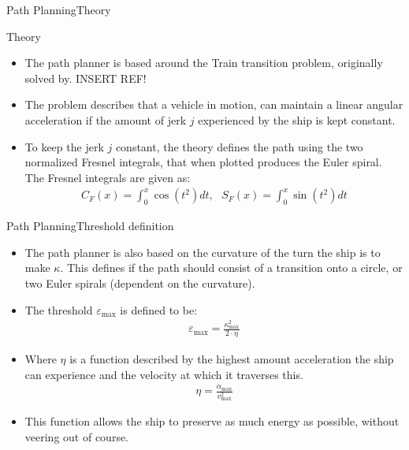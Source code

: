 \documentclass[10pt]{beamer}
\begin{document}
\begin{frame}{Path Planning}{Theory}
  \begin{block}{Theory}
  \begin{itemize}
     \item<1-> The path planner is based around the Train transition problem, originally solved by. INSERT REF!
    \item<2-> The problem describes that a vehicle in motion, can maintain a linear angular acceleration if the amount of jerk $j$ experienced by the ship is kept constant.
    \item<3-> To keep the jerk $j$ constant, the theory defines the path using the two normalized Fresnel integrals, that when plotted produces the Euler spiral. The Fresnel integrals are given as:
    \begin{align}
    C_F(x) = \int_0^x \cos(t^2)dt,\,\,\,\,S_F(x) = \int_0^x \sin(t^2)dt
\label{eq:fresnel}
    \end{align}
  \end{itemize}
  \end{block}
\end{frame}

\begin{frame}{Path Planning}{Threshold definition}
    \begin{itemize}
    	\item The path planner is also based on the curvature of the turn the ship is to make $\kappa$. This defines if the path should consist of a transition onto a circle, or two Euler spirals (dependent on the curvature).
    	\item The threshold $\varepsilon_\text{max}$ is defined to be:
    	\begin{align}
    	\varepsilon_\text{max} = \frac{\kappa_\text{max}^2}{2 \cdot \eta}
    	\end{align}
    	\item Where $\eta$ is a function described by the highest amount acceleration the ship can experience and the velocity at which it traverses this.
    	\begin{align}
    	\eta = \frac{\alpha_\text{max}}{v^2_\text{max}}
    	\end{align}
    	\item This function allows the ship to preserve as much energy as possible, without veering out of course.
    \end{itemize}
\end{frame}
\end{document}
